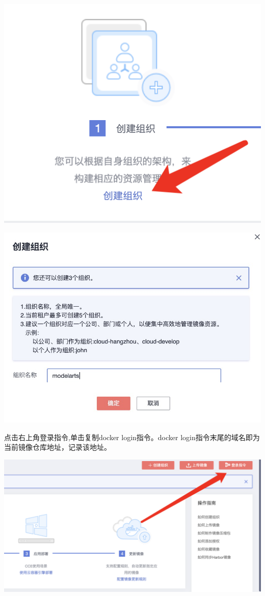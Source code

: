 \documentclass[fontset=windows,openany,UTF8]{ctexbook}
\begin{document}
\includegraphics[scale=0.6]{./assets/docker_05.png}  

\includegraphics[scale=0.4]{./assets/docker_06.png}  

点击右上角登录指令,单击复制docker login指令。docker login指令末尾的域名即为当前镜像仓库地址，记录该地址。

\includegraphics[scale=0.6]{./assets/docker_07.png}  
\end{document}
